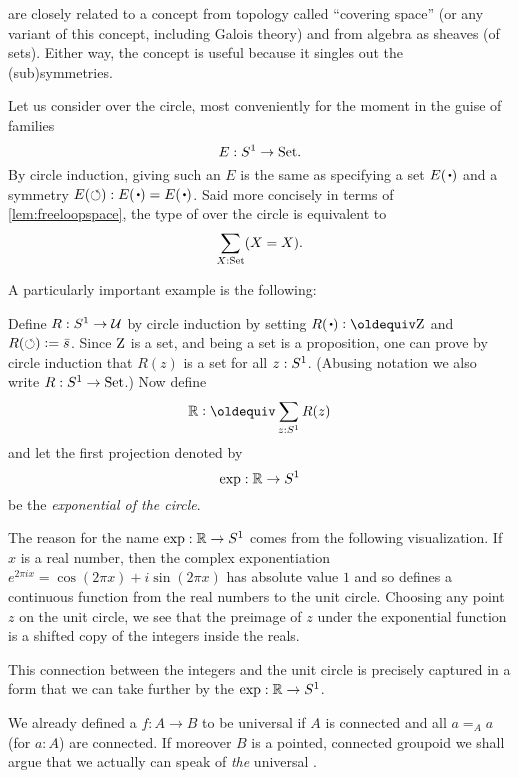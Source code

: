 \begin{remark}
  \Coverings are closely related to a concept from topology called ``covering space'' 
(or any variant of this concept, including Galois theory) and from algebra as sheaves (of sets).  
Either way, the concept is useful because it singles out the (sub)symmetries.  
\end{remark}

\begin{example}\label{xca:coveringsofS1}
Let us consider \coverings over the circle, most conveniently 
for the moment in the guise of families 
$$E:{S^1}\to\mathord{\mathrm{Set}}.$$
By circle induction, giving such an $E$ is the same as 
specifying a set $E(\base)$ and a symmetry $E(\Sloop):E(\base)=E(\base)$.  
Said more concisely in terms of \cref{lem:freeloopspace}, 
the type of \coverings over the circle is equivalent to 
$$\sum_{X:\mathord{\mathrm{Set}}}(X=X).$$
\end{example}
A particularly important example is the following:
\begin{definition}\label{def:RtoS1}
Define $R:{S^1}\to\mathcal{U}$ by circle induction by setting 
$R(\base)\defeq\zet$ and $R(\circlearrowleft)\vcentcolon= \bar {s}$.
Since $\mathrm{Z}$ is a set, and being a set is a proposition,
one can prove by circle induction that $R(z)$ is a set for all $z:{S^1}$.
(Abusing notation we also write $R:{S^1}\to\mathord{\mathrm{Set}}$.) Now define
$$\RR\defeq\sum_{z:\Sc}R(z)$$
and let the first projection denoted by
$$\exp:\mathbb{R}\to {S^1}$$
be the \emph{exponential \covering of the circle}.
\end{definition}

\begin{remark}
  \label{rem:expforreal}
  The reason for the name $\exp:\mathbb{R}\to {S^1}$ comes from the following visualization.   
If $x$ is a real number, then the complex exponentiation 
$e^{2\pi i x}=\cos(2\pi x)+i\sin(2\pi x)$ has absolute value $1$ and 
so defines a continuous function from the real numbers to the unit circle.  
Choosing any point $z$ on the unit circle, we see that the preimage of $z$ under the exponential function is a shifted copy of the integers inside the reals. 
 
This connection between the integers and the unit circle is precisely captured in a form that we can take further by the \covering $\exp:\mathbb{R}\to {S^1}$.
\end{remark}

We already defined a \covering $f:A\to B$ to be universal if $A$ is connected
and all $a=_A a$ (for $a:A$) are connected. 
If moreover $B$ is a pointed, connected groupoid we shall argue that
we actually can speak of \emph{the} universal \covering.

